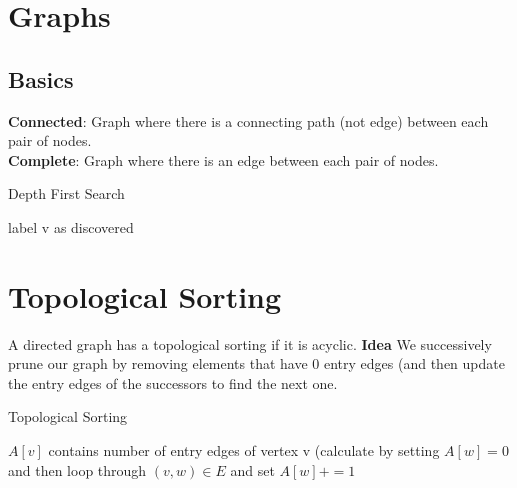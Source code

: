 \documentclass[9pt,landscape,a4paper, table]{extarticle}
\begin{document}
\begin{multicols*}{3}



\section{Graphs}

\subsection{Basics}

\textbf{Connected}: Graph where there is a connecting path (not edge) between each pair of nodes.\\
\textbf{Complete}: Graph where there is an edge between each pair of nodes. 



{\scriptsize
\begin{algorithm}[H]
    \caption{Depth First Search}
    
    \SetAlgoLined
    label v as discovered\\

\end{algorithm}}

\section{Topological Sorting} {
A directed graph has a topological sorting if it is acyclic. \textbf{Idea} We successively prune our graph by removing elements that have 0 entry edges (and then update the entry edges of the successors to find the next one.

{\scriptsize
\begin{algorithm}[H]
    \caption{Topological Sorting}
    
    \SetAlgoLined

$A[v]$ contains number of entry edges of vertex v (calculate by setting $A[w] = 0$ and then loop through $(v, w) \in E$ and set $A[w] += 1$ 


\end{algorithm}}}
\end{multicols*}
\end{document}
